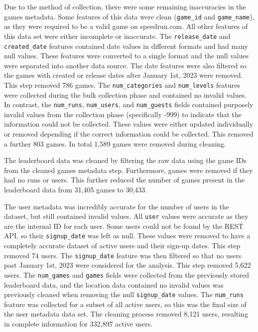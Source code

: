 Due to the method of collection, there were some remaining inaccuracies in the games metadata. Some features of this data were clean (\texttt{game\_id} and \texttt{game\_name}), as they were required to be a valid game on speedrun.com. All other features of this data set were either incomplete or inaccurate. The \texttt{release\_date} and \texttt{created\_date} features contained date values in different formats and had many null values. These features were converted to a single format and the null values were separated into another data source. The date features were also filtered so the games with created or release dates after January 1st, 2023 were removed. This step removed 786 games. The \texttt{num\_categories} and \texttt{num\_levels} features were collected during the bulk collection phase and contained no invalid values. In contrast, the \texttt{num\_runs}, \texttt{num\_users}, and \texttt{num\_guests} fields contained purposely invalid values from the collection phase (specifically -999) to indicate that the information could not be collected. These values were either updated individually or removed depending if the correct information could be collected. This removed a further 803 games. In total 1,589 games were removed during cleaning.


The leaderboard data was cleaned by filtering the raw data using the game IDs from the cleaned games metadata step. Furthermore, games were removed if they had no runs or users. This further reduced the number of games present in the leaderboard data from 31,405 games to 30,433. 


The user metadata was incredibly accurate for the number of users in the dataset, but still contained invalid values. All \texttt{user} values were accurate as they are the internal ID for each user. Some users could not be found by the REST API, so their \texttt{signup\_date} was left as null. These values were removed to have a completely accurate dataset of active users and their sign-up dates. This step removed 74 users. The \texttt{signup\_date} feature was then filtered so that no users past January 1st, 2023 were considered for the analysis. This step removed 5,622 users. The \texttt{num\_games} and \texttt{games} fields were collected from the previously stored leaderboard data, and the location data contained no invalid values was previously cleaned when removing the null \texttt{signup\_date} values. The \texttt{num\_runs} feature was collected for a subset of all active users, so this was the final size of the user metadata data set. The cleaning process removed 8,121 users, resulting in complete information for 332,897 active users.


